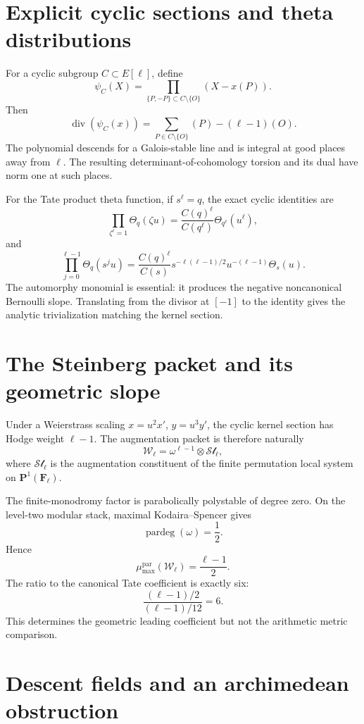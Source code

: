 \documentclass[11pt]{article}
\theoremstyle{definition}
\theoremstyle{remark}
\begin{document}
\section{Explicit cyclic sections and theta distributions}

For a cyclic subgroup $C\subset E[\ell]$, define
\[
 \psi_C(X)=
 \prod_{\{P,-P\}\subset C\setminus\{O\}}
 (X-x(P)).
\]
Then
\[
 \operatorname{div}(\psi_C(x))
 =\sum_{P\in C\setminus\{O\}}(P)-(\ell-1)(O).
\]
The polynomial descends for a Galois-stable line and is integral at good
places away from $\ell$.  The resulting determinant-of-cohomology torsion and
its dual have norm one at such places.

For the Tate product theta function, if $s^\ell=q$, the exact cyclic
identities are
\[
 \prod_{\zeta^\ell=1}\Theta_q(\zeta u)
 =\frac{C(q)^\ell}{C(q^\ell)}\Theta_{q^\ell}(u^\ell),
\]
and
\[
 \prod_{j=0}^{\ell-1}\Theta_q(s^ju)
 =\frac{C(q)^\ell}{C(s)}
  s^{-\ell(\ell-1)/2}u^{-(\ell-1)}\Theta_s(u).
\]
The automorphy monomial is essential: it produces the negative noncanonical
Bernoulli slope.  Translating from the divisor at $[-1]$ to the identity gives
the analytic trivialization matching the kernel section.

\section{The Steinberg packet and its geometric slope}

Under a Weierstrass scaling $x=u^2x'$, $y=u^3y'$, the cyclic kernel section
has Hodge weight $\ell-1$.  The augmentation packet is therefore naturally
\[
 \mathcal W_\ell=\omega^{\ell-1}\otimes\mathcal{St}_\ell,
\]
where $\mathcal{St}_\ell$ is the augmentation constituent of the finite
permutation local system on $\mathbf P^1(\mathbf F_\ell)$.

The finite-monodromy factor is parabolically polystable of degree zero.  On the
level-two modular stack, maximal Kodaira--Spencer gives
\[
 \operatorname{pardeg}(\omega)=\frac12.
\]
Hence
\[
 \mu_{\max}^{\mathrm{par}}(\mathcal W_\ell)
 =\frac{\ell-1}{2}.
\]
The ratio to the canonical Tate coefficient is exactly six:
\[
 \frac{(\ell-1)/2}{(\ell-1)/12}=6.
\]
This determines the geometric leading coefficient but not the arithmetic
metric comparison.

\section{Descent fields and an archimedean obstruction}
\end{document}

